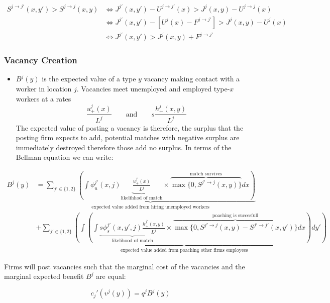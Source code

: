 \documentclass[
  letterpaper,
  DIV=11,
  numbers=noendperiod]{scrartcl}
\providecommand{\tightlist}{%
  \setlength{\itemsep}{0pt}\setlength{\parskip}{0pt}}\usepackage{longtable,booktabs,array}
\begin{document}
\begin{align*}
S^{j\to j'}(x,y') > S^{j\to j}(x,y) &\iff J^{j'}(x,y') - U^{j\to j'}(x) > J^{j}(x,y) - U^{j\to j}(x) \\
&\iff J^{j'}(x,y') - [U^{j}(x) - F^{j\to j'}] > J^{j}(x,y) - U^{j}(x) \\
&\iff J^{j'}(x,y') > J^{j}(x,y) +  F^{j\to j'}
\end{align*}

\hypertarget{vacancy-creation}{%
\subsubsection{Vacancy Creation}\label{vacancy-creation}}

\begin{itemize}
\tightlist
\item
  \(B^j(y)\) is the expected value of a type \(y\) vacancy making
  contact with a worker in location \(j\). Vacancies meet unemployed and
  employed type-\(x\) workers at a rates
  \[\frac{u_{+}^j(x)}{L^j} \qquad \text{and} \qquad s\frac{h_{+}^j(x,y)}{L^j}\]
  The expected value of posting a vacancy is therefore, the surplus that
  the posting firm expects to add, potential matches with negative
  surplus are immediately destroyed therefore those add no surplus. In
  terms of the Bellman equation we can write:
\end{itemize}

\begin{align}
B^j(y) &= \underbrace{\sum_{j'\in\{1,2\}}\left( \int\phi_u^{j'}(x,j)\underbrace{\frac{u_{+}^{j'}(x)}{L^{j}}}_{\text{likelihhod of match}}\times\overbrace{ \max\{0, S^{j'\to j}(x,y)\} }^{\text{match survives}}dx\right)}_{\text{expected value added from hiring unemployed workers}} \nonumber \\
& +\underbrace{\sum_{j'\in\{1,2\}}\left(\int \left(\int\underbrace{s\phi_s^{j'}(x,y',j)\frac{h_{+}^{j'}(x,y)}{L^{j}}}_{\text{likelihood of match}}\times \overbrace{ \max\{0, S^{j' \to j}(x,y)-S^{j' \to j'}(x,y')\}}^{\text{poaching is succesfull}}dx\right)dy'\right)}_{\text{expected value added from poaching other firms employees}} \label{eq-vacancy-posting}
\end{align}

Firms will post vacancies such that the marginal cost of the vacancies
and the marginal expected benefit \(B^j\) are equal:

\begin{equation}
  \label{eq-vacancy-posting-clearing}
  c_{j}'(v^{j}(y))=q^{j}B^{j}(y)
\end{equation}
\end{document}
